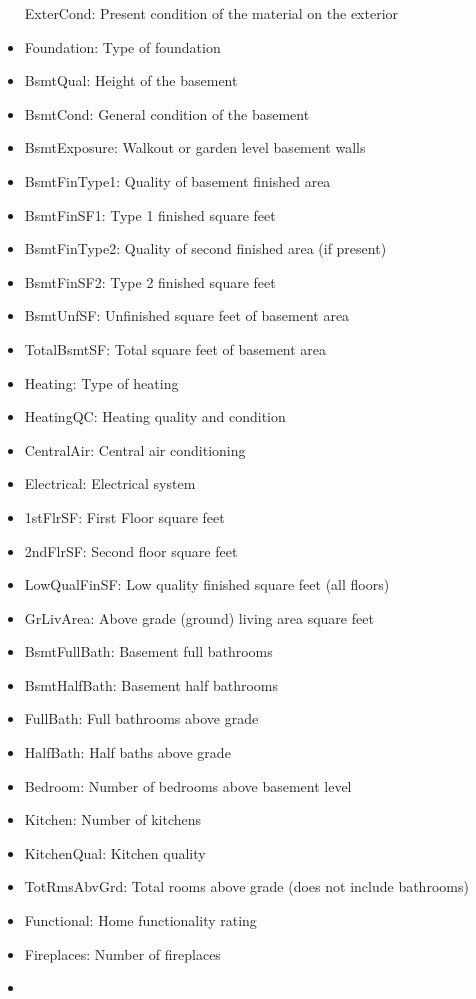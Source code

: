 \documentclass[11pt, a4paper , landscape]{article}
\begin{document}
\begin{itemize}
  ExterCond: Present condition of the material on the exterior
\item
  Foundation: Type of foundation
\item
  BsmtQual: Height of the basement
\item
  BsmtCond: General condition of the basement
\item
  BsmtExposure: Walkout or garden level basement walls
\item
  BsmtFinType1: Quality of basement finished area
\item
  BsmtFinSF1: Type 1 finished square feet
\item
  BsmtFinType2: Quality of second finished area (if present)
\item
  BsmtFinSF2: Type 2 finished square feet
\item
  BsmtUnfSF: Unfinished square feet of basement area
\item
  TotalBsmtSF: Total square feet of basement area
\item
  Heating: Type of heating
\item
  HeatingQC: Heating quality and condition
\item
  CentralAir: Central air conditioning
\item
  Electrical: Electrical system
\item
  1stFlrSF: First Floor square feet
\item
  2ndFlrSF: Second floor square feet
\item
  LowQualFinSF: Low quality finished square feet (all floors)
\item
  GrLivArea: Above grade (ground) living area square feet
\item
  BsmtFullBath: Basement full bathrooms
\item
  BsmtHalfBath: Basement half bathrooms
\item
  FullBath: Full bathrooms above grade
\item
  HalfBath: Half baths above grade
\item
  Bedroom: Number of bedrooms above basement level
\item
  Kitchen: Number of kitchens
\item
  KitchenQual: Kitchen quality
\item
  TotRmsAbvGrd: Total rooms above grade (does not include bathrooms)
\item
  Functional: Home functionality rating
\item
  Fireplaces: Number of fireplaces
\item

\end{itemize}
\end{document}
